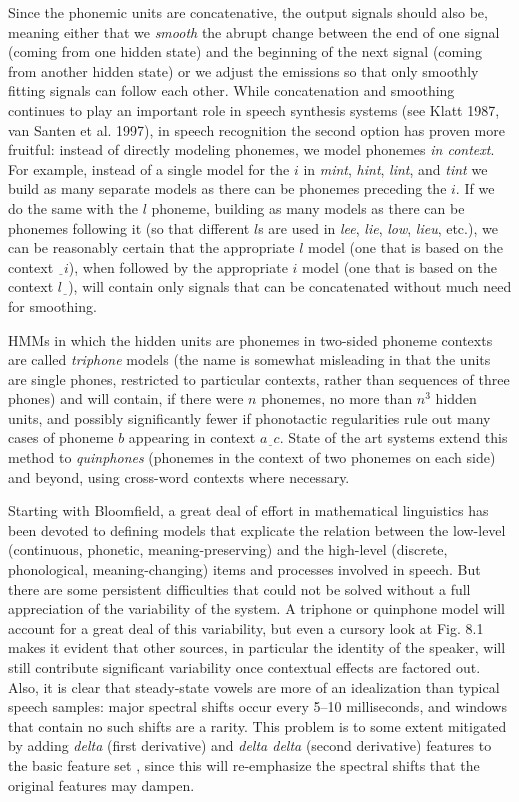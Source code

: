 Since the phonemic units are concatenative, the output signals should also be,
meaning either that we {\it smooth} the abrupt change between the end of one
signal (coming from one hidden state) and the beginning of the next signal
(coming from another hidden state) or we adjust the emissions so that only
smoothly fitting signals can follow each other. While concatenation and
smoothing continues to play an important role in speech synthesis systems (see
Klatt 1987, van Santen et al. 1997),\nocite{Klatt:1987}\nocite{Santen:1997} in
speech recognition the second option has proven more fruitful: instead of
directly modeling phonemes, we model phonemes {\it in context}. For example,
instead of a single model for the $i$ in {\it mint}, {\it hint}, {\it lint},
and {\it tint} we build as many separate models as there can be phonemes
preceding the $i$.  If we do the same with the $l$ phoneme, building as many
models as there can be phonemes following it (so that different $l$s are used
in {\it lee}, {\it lie}, {\it low}, {\it lieu}, etc.), we can be reasonably
certain that the appropriate $l$ model (one that is based on the context
$\underline{\ \ }i$), when followed by the appropriate $i$ model (one that is
based on the context $l\underline{\ \ }$), will contain only signals that can
be concatenated without much need for smoothing.

HMMs in which the hidden units are phonemes in two-sided phoneme contexts are
called {\it triphone} models (the name is somewhat misleading
in that the units are single phones, restricted to particular contexts,
rather than sequences of three phones) and will contain, if there were $n$
phonemes, no more than $n^3$ hidden units, and possibly significantly fewer if
phonotactic regularities rule out many cases of phoneme $b$ appearing in
context $a\underline{\ \ }c$. State of the art systems extend this method to
{\it quinphones} (phonemes in the context of two phonemes on each side) and
beyond, using cross-word contexts where necessary. 

Starting with Bloomfield, a great deal of effort in mathematical linguistics
has been devoted to defining models that explicate the relation between the
low-level (continuous, phonetic, meaning-preserving) and the high-level
(discrete, phonological, meaning-changing) items and processes involved in
speech. But there are some persistent difficulties that could not be solved
without a full appreciation of the variability of the system.  A triphone or
quinphone model will account for a great deal of this variability, but even a
cursory look at Fig. 8.1 makes it evident that other sources, in particular
the identity of the speaker, will still contribute significant variability
once contextual effects are factored out. Also, it is clear that steady-state
vowels are more of an idealization than typical speech samples: major spectral
shifts occur every 5--10 milliseconds, and windows that contain no such shifts
are a rarity. This problem is to some extent mitigated by adding {\it delta}
(first derivative) and {\it delta delta} (second derivative) features to the
basic feature set \cite{Furui:1986}, since this will
re-emphasize the spectral shifts that the original features may dampen.

